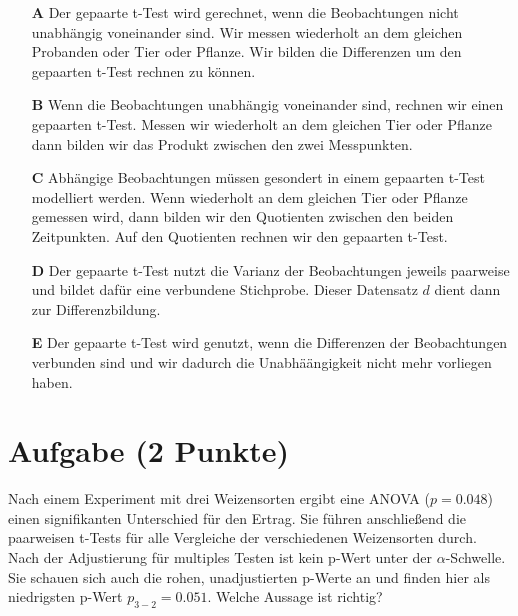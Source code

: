 \documentclass[a4paper, 9pt]{scrartcl}\usepackage[]{graphicx}\usepackage[]{xcolor}
\begin{document}
\begin{enumerate}
\item [\textbf{A} \msquare] Der gepaarte t-Test wird gerechnet, wenn die Beobachtungen nicht unabhängig voneinander sind. Wir messen wiederholt an dem gleichen Probanden oder Tier oder Pflanze. Wir bilden die Differenzen um den gepaarten t-Test rechnen zu können.
\item [\textbf{B} \msquare] Wenn die Beobachtungen unabhängig voneinander sind, rechnen wir einen gepaarten t-Test. Messen wir wiederholt an dem gleichen Tier oder Pflanze dann bilden wir das Produkt zwischen den zwei Messpunkten.
\item [\textbf{C} \msquare] Abhängige Beobachtungen müssen gesondert in einem gepaarten t-Test modelliert werden. Wenn wiederholt an dem gleichen Tier oder Pflanze gemessen wird, dann bilden wir den Quotienten zwischen den beiden Zeitpunkten. Auf den Quotienten rechnen wir den gepaarten t-Test.
\item [\textbf{D} \msquare] Der gepaarte t-Test nutzt die Varianz der Beobachtungen jeweils paarweise und bildet dafür eine verbundene Stichprobe. Dieser Datensatz $d$ dient dann zur Differenzbildung.
\item [\textbf{E} \msquare] Der gepaarte t-Test wird genutzt, wenn die Differenzen der Beobachtungen verbunden sind und wir dadurch die Unabhäängigkeit nicht mehr vorliegen haben.
\end{enumerate}

\section{Aufgabe \hfill (2 Punkte)}



Nach einem Experiment mit drei Weizensorten ergibt eine ANOVA ($p = 0.048$) einen signifikanten Unterschied für den Ertrag. Sie führen anschließend die paarweisen t-Tests für alle Vergleiche der verschiedenen Weizensorten durch. Nach der Adjustierung für multiples Testen ist kein p-Wert unter der $\alpha$-Schwelle. Sie schauen sich auch die rohen, unadjustierten p-Werte an und finden hier als niedrigsten p-Wert $p_{3-2} = 0.051$. Welche Aussage ist richtig?
\end{document}
